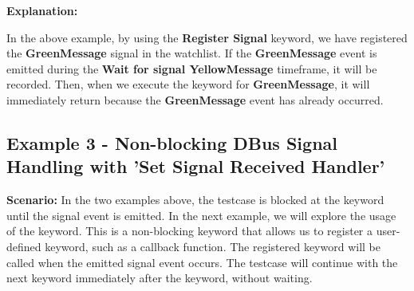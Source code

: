 
\textbf{Explanation:}

In the above example, by using the \textbf{Register Signal} keyword, we have registered the \textbf{GreenMessage} signal in the watchlist. If the \textbf{GreenMessage} event is emitted
during the \textbf{Wait for signal YellowMessage} timeframe, it will be recorded. Then, when we execute the  keyword for \textbf{GreenMessage}, it will immediately return
because the \textbf{GreenMessage} event has already occurred.


\hypertarget{description-example3}{%
\subsection{\texorpdfstring{\textbf{Example 3 - Non-blocking DBus Signal Handling with 'Set Signal Received Handler'}}{Example 3 - Non-blocking DBus Signal Handling with 'Set Signal Received Handler'}}\label{description-example3}}

\textbf{Scenario:}
In the two examples above, the testcase is blocked at the  keyword until the signal event is emitted. In the next example, we will explore the usage of
the  keyword. This is a non-blocking keyword that allows us to register a user-defined keyword, such as a callback function. The registered
keyword will be called when the emitted signal event occurs. The testcase will continue with the next keyword immediately after the  keyword, without waiting.


